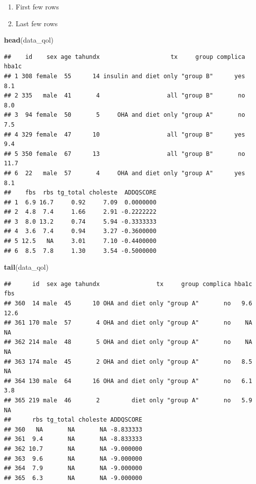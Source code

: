 \documentclass[]{book}
\newenvironment{Shaded}{\begin{snugshade}}{\end{snugshade}}
\newcommand{\KeywordTok}[1]{\textcolor[rgb]{0.13,0.29,0.53}{\textbf{#1}}}
\newcommand{\NormalTok}[1]{#1}
\providecommand{\tightlist}{%
  \setlength{\itemsep}{0pt}\setlength{\parskip}{0pt}}
\theoremstyle{definition}
\theoremstyle{definition}
\theoremstyle{remark}
\begin{document}
\begin{enumerate}
\def\labelenumi{\arabic{enumi}.}
\tightlist
\item
  First few rows
\item
  Last few rows
\end{enumerate}

\begin{Shaded}
\begin{Highlighting}[]
\KeywordTok{head}\NormalTok{(data_qol)}
\end{Highlighting}
\end{Shaded}

\begin{verbatim}
##    id    sex age tahundx                    tx     group complica hba1c
## 1 308 female  55      14 insulin and diet only "group B"      yes   8.1
## 2 335   male  41       4                   all "group B"       no   8.0
## 3  94 female  50       5     OHA and diet only "group A"       no   7.5
## 4 329 female  47      10                   all "group B"      yes   9.4
## 5 350 female  67      13                   all "group B"       no  11.7
## 6  22   male  57       4     OHA and diet only "group A"      yes   8.1
##    fbs  rbs tg_total choleste  ADDQSCORE
## 1  6.9 16.7     0.92     7.09  0.0000000
## 2  4.8  7.4     1.66     2.91 -0.2222222
## 3  8.0 13.2     0.74     5.94 -0.3333333
## 4  3.6  7.4     0.94     3.27 -0.3600000
## 5 12.5   NA     3.01     7.10 -0.4400000
## 6  8.5  7.8     1.30     3.54 -0.5000000
\end{verbatim}

\begin{Shaded}
\begin{Highlighting}[]
\KeywordTok{tail}\NormalTok{(data_qol)}
\end{Highlighting}
\end{Shaded}

\begin{verbatim}
##      id  sex age tahundx                tx     group complica hba1c  fbs
## 360  14 male  45      10 OHA and diet only "group A"       no   9.6 12.6
## 361 170 male  57       4 OHA and diet only "group A"       no    NA   NA
## 362 214 male  48       5 OHA and diet only "group A"       no    NA   NA
## 363 174 male  45       2 OHA and diet only "group A"       no   8.5   NA
## 364 130 male  64      16 OHA and diet only "group A"       no   6.1  3.8
## 365 219 male  46       2         diet only "group A"       no   5.9   NA
##      rbs tg_total choleste ADDQSCORE
## 360   NA       NA       NA -8.833333
## 361  9.4       NA       NA -8.833333
## 362 10.7       NA       NA -9.000000
## 363  9.6       NA       NA -9.000000
## 364  7.9       NA       NA -9.000000
## 365  6.3       NA       NA -9.000000
\end{verbatim}
\end{document}
